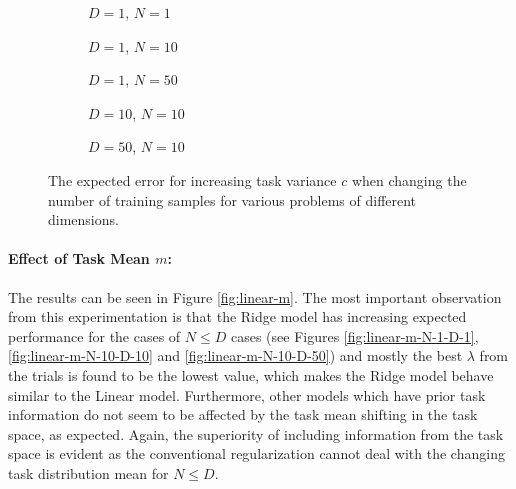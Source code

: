 \begin{figure}[!h]
  \centering
    \begin{subfigure}{0.33\textwidth}
      \centering
      \caption{$D=1$, $N=1$}
      \label{fig:linear-c-N-1-D-1}
    \end{subfigure}
    \begin{subfigure}{0.33\textwidth}
      \centering
      \caption{$D=1$, $N=10$}
      \label{fig:linear-c-N-10-D-1}
    \end{subfigure}
    \begin{subfigure}{0.33\textwidth}
      \centering
      \caption{$D=1$, $N=50$}
      \label{fig:linear-c-N-50-D-1}
    \end{subfigure}

    \begin{subfigure}{0.33\textwidth}
      \centering
      \caption{$D=10$, $N=10$}
      \label{fig:linear-c-N-10-D-10}
    \end{subfigure}
    \begin{subfigure}{0.33\textwidth}
      \centering
      \caption{$D=50$, $N=10$}
      \label{fig:linear-c-N-10-D-50}
    \end{subfigure}  

  \caption{The expected error for increasing task variance $c$ when changing the number of training samples for various problems of different dimensions.}
  \label{fig:linear-c}
\end{figure}


\paragraph{Effect of Task Mean $m$:} The results can be seen in Figure \ref{fig:linear-m}. The most important observation from this experimentation is that the Ridge model has increasing expected performance for the cases of $N\leq D$ cases (see Figures \ref{fig:linear-m-N-1-D-1}, \ref{fig:linear-m-N-10-D-10} and \ref{fig:linear-m-N-10-D-50}) and mostly the best $\lambda$ from the trials is found to be the lowest value, which makes the Ridge model behave similar to the Linear model. Furthermore, other models which have prior task information do not seem to be affected by the task mean shifting in the task space, as expected. Again, the superiority of including information from the task space is evident as the conventional regularization cannot deal with the changing task distribution mean for $N\leq D$.

